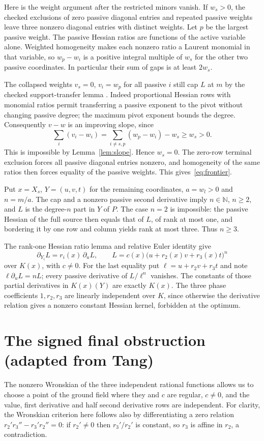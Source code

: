 \documentclass[11pt,a4paper]{article}
\begin{document}
Here is the weight argument after the restricted minors vanish. If $w_s>0$, the checked exclusions of zero passive diagonal entries and repeated passive weights leave three nonzero diagonal entries with distinct weights. Let $p$ be the largest passive weight. The passive Hessian ratios are functions of the active variable alone. Weighted homogeneity makes each nonzero ratio a Laurent monomial in that variable, so $w_p-w_i$ is a positive integral multiple of $w_s$ for the other two passive coordinates. In particular their sum of gaps is at least $2w_s$.

The collapsed weights $v_s=0$, $v_i=w_p$ for all passive $i$ still cap $L$ at $m$ by the checked support-transfer lemma . Indeed proportional Hessian rows with monomial ratios permit transferring a passive exponent to the pivot without changing passive degree; the maximum pivot exponent bounds the degree. Consequently $v-w$ is an improving slope, since
\[
 \sum_i(v_i-w_i)=\sum_{i\ne s,p}(w_p-w_i)-w_s\ge w_s>0.
\]
This is impossible by Lemma~\ref{lem:slope}. Hence $w_s=0$. The zero-row terminal exclusion forces all passive diagonal entries nonzero, and homogeneity of the same ratios then forces equality of the passive weights. This gives~\eqref{eq:frontier}.

Put $x=X_s$, $Y=(u,v,t)$ for the remaining coordinates, $a=w_l>0$ and $n=m/a$. The cap and a nonzero passive second derivative imply $n\in\mathbb N$, $n\ge2$, and $L$ is the degree-$n$ part in $Y$ of $P$. The case $n=2$ is impossible: the passive Hessian of the full source then equals that of $L$, of rank at most one, and bordering it by one row and column yields rank at most three. Thus $n\ge3$.

The rank-one Hessian ratio lemma and relative Euler identity give
\[
 \partial_{Y_i}L=r_i(x)\,\partial_u L,\qquad
 L=c(x)\bigl(u+r_2(x)v+r_3(x)t\bigr)^n
\]
over $K(x)$, with $c\ne0$. For the last equality put $\ell=u+r_2v+r_3t$ and note $\ell\partial_u L=nL$; every passive derivative of $L/\ell^n$ vanishes. The constants of those partial derivatives in $K(x)(Y)$ are exactly $K(x)$. The three phase coefficients $1,r_2,r_3$ are linearly independent over $K$, since otherwise the derivative relation gives a nonzero constant Hessian kernel, forbidden at the optimum.

\section{The signed final obstruction (adapted from Tang)}
The nonzero Wronskian of the three independent rational functions allows us to choose a point of the ground field where they and $c$ are regular, $c\ne0$, and the value, first derivative and half second derivative rows are independent. For clarity, the Wronskian criterion here follows also by differentiating a zero relation $r_2'r_3''-r_3'r_2''=0$: if $r_2'\ne0$ then $r_3'/r_2'$ is constant, so $r_3$ is affine in $r_2$, a contradiction.
\end{document}
